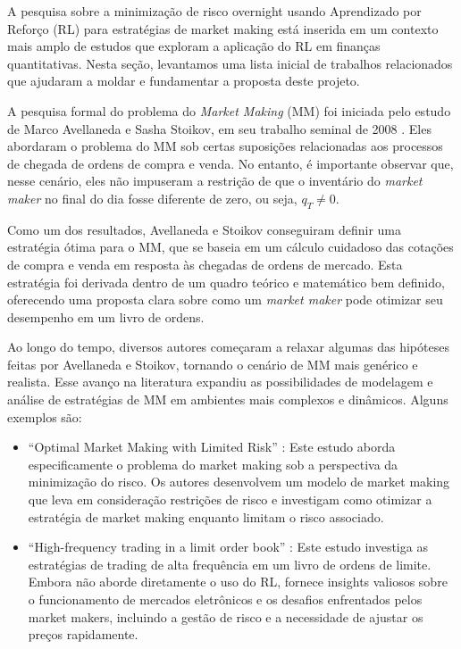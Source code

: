 A pesquisa sobre a minimização de risco overnight usando Aprendizado por Reforço (RL) para estratégias de market making está inserida em um contexto mais amplo de estudos que exploram a aplicação do RL em finanças quantitativas. Nesta seção, levantamos uma lista inicial de trabalhos relacionados que ajudaram a moldar e fundamentar a proposta deste projeto.

A pesquisa formal do problema do \textit{Market Making} (MM) foi iniciada pelo estudo de  Marco Avellaneda e Sasha Stoikov, em seu trabalho seminal de 2008 \citep{Avellaneda2008}. Eles abordaram o problema do MM sob certas suposições relacionadas aos processos de chegada de ordens de compra e venda. No entanto, é importante observar que, nesse cenário, eles não impuseram a restrição de que o inventário do \textit{market maker} no final do dia fosse diferente de zero, ou seja, $q_T \neq 0$.

Como um dos resultados, Avellaneda e Stoikov conseguiram definir uma estratégia ótima para o MM, que se baseia em um cálculo cuidadoso das cotações de compra e venda em resposta às chegadas de ordens de mercado. Esta estratégia foi derivada dentro de um quadro teórico e matemático bem definido, oferecendo uma proposta clara sobre como um \textit{market maker} pode otimizar seu desempenho em um livro de ordens.

Ao longo do tempo, diversos autores começaram a relaxar algumas das hipóteses feitas por Avellaneda e Stoikov, tornando o cenário de MM mais genérico e realista. Esse avanço na literatura expandiu as possibilidades de modelagem e análise de estratégias de MM em ambientes mais complexos e dinâmicos. Alguns exemplos são:
\begin{itemize}
    \item ``Optimal Market Making with Limited Risk'' \citep{Gueant2017}: Este estudo aborda especificamente o problema do market making sob a perspectiva da minimização do risco. Os autores desenvolvem um modelo de market making que leva em consideração restrições de risco e investigam como otimizar a estratégia de market making enquanto limitam o risco associado.
    \item ``High-frequency trading in a limit order book'' \citep{Avellaneda2008}: Este estudo investiga as estratégias de trading de alta frequência em um livro de ordens de limite. Embora não aborde diretamente o uso do RL, fornece insights valiosos sobre o funcionamento de mercados eletrônicos e os desafios enfrentados pelos market makers, incluindo a gestão de risco e a necessidade de ajustar os preços rapidamente.
\end{itemize}


